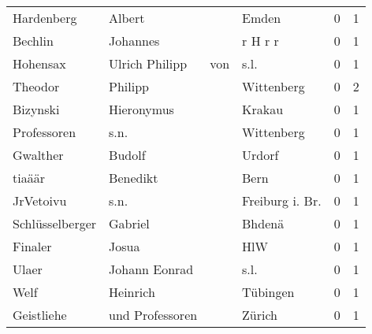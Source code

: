\begin{center}
\begin{tiny}
\begin{longtabu}{llllrr}
               Hardenberg &                             Albert &             &                                       Emden &          0 &         1 \\
                  Bechlin &                           Johannes &             &                                     r H r r &          0 &         1 \\
                 Hohensax &                     Ulrich Philipp &         von &                                        s.l. &          0 &         1 \\
                  Theodor &                            Philipp &             &                                  Wittenberg &          0 &         2 \\
                 Bizynski &                         Hieronymus &             &                                      Krakau &          0 &         1 \\
              Professoren &                               s.n. &             &                                  Wittenberg &          0 &         1 \\
                 Gwalther &                             Budolf &             &                                      Urdorf &          0 &         1 \\
                   tiaäär &                           Benedikt &             &                                        Bern &          0 &         1 \\
                JrVetoivu &                               s.n. &             &                            Freiburg i. Br.  &          0 &         1 \\
          Schlüsselberger &                            Gabriel &             &                                      Bhdenä &          0 &         1 \\
                  Finaler &                              Josua &             &                                         HlW &          0 &         1 \\
                    Ulaer &                      Johann Eonrad &             &                                        s.l. &          0 &         1 \\
                     Welf &                           Heinrich &             &                                    Tübingen &          0 &         1 \\
               Geistliehe &                    und Professoren &             &                                      Zürich &          0 &         1 \\

\end{longtabu}
\end{tiny}
\end{center}
